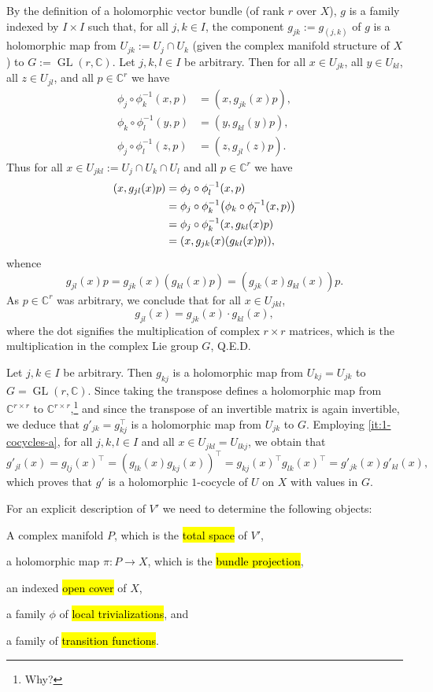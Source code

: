 \documentclass[a4paper]{amsart}
\newcommand{\C}{\mathbb{C}}
\theoremstyle{remark}
\numberwithin{equation}{question}
\DeclarePairedDelimiter\paren{(}{)}
\DeclareMathOperator{\GL}{GL}
\begin{document}
\begin{solution}%
\begin{solenum}
\item By the definition of a holomorphic vector bundle (of rank $r$ over $X$), $g$ is a family indexed by $I \times I$ such that, for all $j,k \in I$, the component $g_{jk} := g_{(j,k)}$ of $g$ is a holomorphic map from $U_{jk} := U_j \cap U_k$ (given the complex manifold structure of $X$) to $G := \GL(r,\C)$. Let $j,k,l \in I$ be arbitrary. Then for all $x \in U_{jk}$, all $y \in U_{kl}$, all $z \in U_{jl}$, and all $p \in \C^r$ we have
\begin{align*}
\phi_j \circ \phi_k^{-1}(x,p) &= (x,g_{jk}(x)p), \\
\phi_k \circ \phi_l^{-1}(y,p) &= (y,g_{kl}(y)p), \\
\phi_j \circ \phi_l^{-1}(z,p) &= (z,g_{jl}(z)p).
\end{align*}
Thus for all $x \in U_{jkl} := U_j \cap U_k \cap U_l$ and all $p \in \C^r$ we have
\begin{align*}
(x,g_{jl}(x)p) &= \phi_j \circ \phi_l^{-1}(x,p) \\
&= \phi_j \circ \phi_k^{-1}\paren*{\phi_k \circ \phi_l^{-1}(x,p)} \\
&= \phi_j \circ \phi_k^{-1}(x,g_{kl}(x)p) \\
&= \paren*{x,g_{jk}(x)(g_{kl}(x)p)},
\end{align*}
whence
\[
g_{jl}(x)p = g_{jk}(x)(g_{kl}(x)p) = (g_{jk}(x)g_{kl}(x))p.
\]
As $p \in \C^r$ was arbitrary, we conclude that for all $x \in U_{jkl}$,
\[
g_{jl}(x) = g_{jk}(x) \cdot g_{kl}(x),
\]
where the dot signifies the multiplication of complex $r \times r$ matrices, which is the multiplication in the complex Lie group $G$, Q.E.D.

\item Let $j,k \in I$ be arbitrary. Then $g_{kj}$ is a holomorphic map from $U_{kj} = U_{jk}$ to $G = \GL(r,\C)$. Since taking the transpose defines a holomorphic map from $\C^{r\times r}$ to $\C^{r \times r}$,\footnote{Why?} and since the transpose of an invertible matrix is again invertible, we deduce that $g'_{jk} = g_{kj}^\top$ is a holomorphic map from $U_{jk}$ to $G$.
Employing \cref{it:1-cocycles-a}, for all $j,k,l \in I$ and all $x \in U_{jkl} = U_{lkj}$, we obtain that
\[
g'_{jl}(x) = g_{lj}(x)^\top = (g_{lk}(x)g_{kj}(x))^\top = g_{kj}(x)^\top g_{lk}(x)^\top = g'_{jk}(x)g'_{kl}(x),
\]
which proves that $g'$ is a holomorphic $1$-cocycle of $U$ on $X$ with values in $G$.

For an explicit description of $V'$ we need to determine the following objects:
\begin{solenum}
\item A complex manifold $P$, which is the \hl{total space} of $V'$,
\item a holomorphic map $\pi \colon P \to X$, which is the \hl{bundle projection},
\item an indexed \hl{open cover} of $X$,
\item a family $\phi$ of \hl{local trivializations}, and
\item a family of \hl{transition functions}.
\end{solenum}


\end{solenum}
\end{solution}
\end{document}
